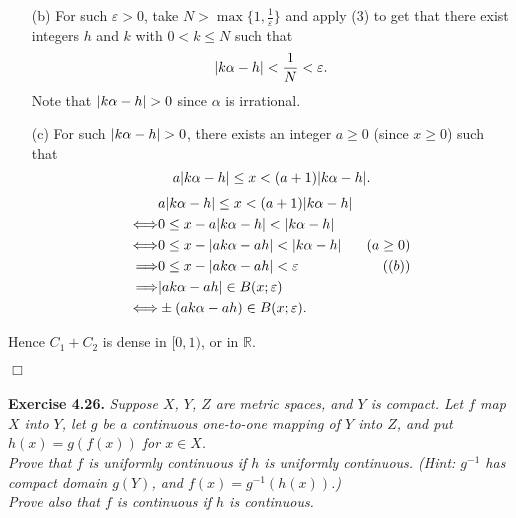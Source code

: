 \documentclass{article}
\begin{document}
\begin{enumerate}
\begin{enumerate}
  \item[(b)]
  For such $\varepsilon > 0$, take $N > \max\{1, \frac{1}{\varepsilon} \}$
  and apply (3) to get that
  there exist integers $h$ and $k$ with $0 < k \leq N$ such that
  \[
    \abs{ k\alpha - h } < \frac{1}{N} < \varepsilon.
  \]
  Note that $\abs{ k \alpha - h } > 0$ since $\alpha$ is irrational.

  \item[(c)]
  For such $\abs{ k \alpha - h } > 0$, there exists an integer $a \geq 0$
  (since $x \geq 0$)
  such that
  \[
    a\abs{ k \alpha - h } \leq x < (a+1)\abs{ k \alpha - h }.
  \]
  \begin{align*}
    &a\abs{ k \alpha - h } \leq x < (a+1)\abs{ k \alpha - h } \\
    \Longleftrightarrow&
    0 \leq x - a\abs{ k \alpha - h } < \abs{ k \alpha - h } \\
    \Longleftrightarrow&
    0 \leq x - \abs{ ak \alpha - ah } < \abs{ k \alpha - h }
      &(a \geq 0) \\
    \Longrightarrow&
    0 \leq x - \abs{ ak \alpha - ah } < \varepsilon
      &((b)) \\
    \Longrightarrow&
    \abs{ ak \alpha - ah } \in B(x;\varepsilon) \\
    \Longleftrightarrow&
    \pm(ak \alpha - ah) \in B(x;\varepsilon).
  \end{align*}
  \end{enumerate}
  Hence $C_1+C_2$ is dense in $[0,1)$, or in $\mathbb{R}$.
\end{enumerate}
$\Box$\\\\






\textbf{Exercise 4.26.}
\emph{Suppose $X$, $Y$, $Z$ are metric spaces, and $Y$ is compact.
Let $f$ map $X$ into $Y$,
let $g$ be a continuous one-to-one mapping of $Y$ into $Z$,
and put $h(x) = g(f(x))$ for $x \in X$.} \\

\emph{Prove that $f$ is uniformly continuous if $h$ is uniformly continuous.
(Hint: $g^{-1}$ has compact domain $g(Y)$, and $f(x) = g^{-1}(h(x))$.)} \\

\emph{Prove also that $f$ is continuous if $h$ is continuous.} \\
\end{document}
